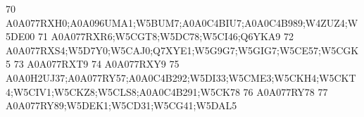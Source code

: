 \documentclass{beamer}
\begin{document}
\begin{frame}[fragile]
\begin{itemize}
\begin{Schunk}
\begin{Soutput}
70                                                                                                                                                                                                                                                                                                               A0A077RXH0;A0A096UMA1;W5BUM7;A0A0C4BIU7;A0A0C4B989;W4ZUZ4;W5DE00
71                                                                                                                                                                                                                                                                                                                                         A0A077RXR6;W5CGT8;W5DC78;W5CI46;Q6YKA9
72                                                                                                                                                                                                                                                                                                                    A0A077RXS4;W5D7Y0;W5CAJ0;Q7XYE1;W5G9G7;W5GIG7;W5CE57;W5CGK5
73                                                                                                                                                                                                                                                                                                                                                                     A0A077RXT9
74                                                                                                                                                                                                                                                                                                                                                                     A0A077RXY9
75                                                                                                                                                                                                                                                                            A0A0H2UJ37;A0A077RY57;A0A0C4B292;W5DI33;W5CME3;W5CKH4;W5CKT4;W5CIV1;W5CKZ8;W5CLS8;A0A0C4B291;W5CK78
76                                                                                                                                                                                                                                                                                                                                                                     A0A077RY78
77                                                                                                                                                                                                                                                                                                                                         A0A077RY89;W5DEK1;W5CD31;W5CG41;W5DAL5

\end{Soutput}
\end{Schunk}
\end{itemize}
\end{frame}
\end{document}
